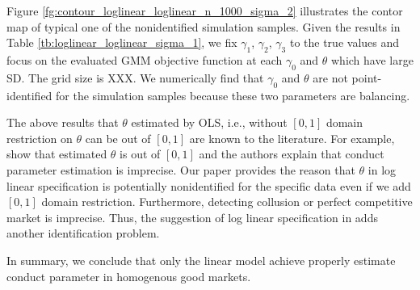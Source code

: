\documentclass[11pt, a4paper]{article}
\begin{document}
Figure \ref{fg:contour_loglinear_loglinear_n_1000_sigma_2} illustrates the contor map of typical one of the nonidentified simulation samples. Given the results in Table \ref{tb:loglinear_loglinear_sigma_1}, we fix $\gamma_1$, $\gamma_2$, $\gamma_3$ to the true values and focus on the evaluated GMM objective function at each $\gamma_0$ and $\theta$ which have large SD. The grid size is XXX. We numerically find that $\gamma_0$ and $\theta$ are not point-identified for the simulation samples because these two parameters are balancing.

The above results that $\theta$ estimated by OLS, i.e., without $[0,1]$ domain restriction on $\theta$ can be out of $[0,1]$ are known to the literature. For example, \cite{okazaki2022excess} show that estimated $\theta$ is out of $[0,1]$ and the authors explain that conduct parameter estimation is imprecise. Our paper provides the reason that $\theta$ in log linear specification is potentially nonidentified for the specific data even if we add $[0,1]$ domain restriction. Furthermore, detecting collusion or perfect competitive market is imprecise. Thus, the suggestion of log linear specification in \cite{perloff2012collinearity} adds another identification problem. 

In summary, we conclude that only the linear model achieve properly estimate conduct parameter in homogenous good markets. 







\end{document}
